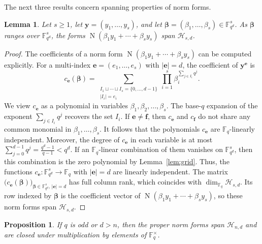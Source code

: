 \documentclass[12pt,reqno]{amsart}
\newtheorem{lem}[thm]{Lemma}
\newtheorem{prop}[thm]{Proposition}
\theoremstyle{definition}
\newcommand{\Nm}{\operatorname{N}}
\newcommand{\F}{\mathbb{F}}
\newcommand{\cH}{\mathcal H}
\begin{document}
The next three results concern spanning properties of norm forms.

\begin{lem}\label{lem:norm-coefficient-separation}
Let $s\geq1$, let $\mathbf y=(y_1,\ldots,y_s)$, and let
$\boldsymbol{\beta}=(\beta_1,\ldots,\beta_s)\in \F_{q^d}^s$. As $\boldsymbol{\beta}$ ranges over $\F_{q^d}^s$, the forms $\Nm(\beta_1y_1+\cdots+\beta_sy_s)$ span $\cH_{s,d}$.
\end{lem}

\begin{proof}
The coefficients of a norm form $\Nm(\beta_1y_1+\cdots+\beta_sy_s)$ can be computed explicitly. For a multi-index $\mathbf e=(e_1,\ldots,e_s)$ with
$|\mathbf e|=d$, the coefficient of
$\mathbf y^{\mathbf e}$ is
\begin{equation}\label{eq:coefficient-polynomial}
 c_{\mathbf e}(\boldsymbol{\beta})=\sum_{\substack{I_1\sqcup\cdots\sqcup I_s=\{0,\ldots,d-1\}\\
                   |I_i|=e_i}}
    \prod_{i=1}^s
    \beta_i^{\sum_{j\in I_i}q^j}.
\end{equation}
We view $c_{\mathbf{e}}$ as a polynomial in variables $\beta_1, \beta_2, \ldots, \beta_s$. The base-$q$ expansion of the exponent
$\sum_{j\in I_i}q^j$ recovers the set $I_i$. If $\mathbf e\neq\mathbf f$, then $c_{\mathbf e}$ and $c_{\mathbf f}$ do not share any common monomial in $\beta_1, \ldots, \beta_{s}$. It follows that the polynomials $c_{\mathbf{e}}$ are $\F_q$-linearly independent. Moreover, the degree of $c_{\mathbf{e}}$ in each variable is at most $\sum_{j=0}^{d-1}q^j=\frac{q^d-1}{q-1}<q^d$. If an $\F_q$-linear combination of them vanishes on $\F_{q^d}^s$, then this combination is the zero polynomial by  Lemma~\ref{lem:grid}. Thus, the functions $c_{\mathbf{e}}\colon\F_{q^d}^s\to\F_q$ with $|\mathbf{e}|=d$ are linearly independent. The matrix $\bigl(c_{\mathbf{e}}(\boldsymbol\beta)\bigr)_{\boldsymbol\beta\in \F_{q^d}^s,\,|\mathbf{e}|=d}$ has full column rank, which coincides with $\dim_{\F_q}\cH_{s,d}$. Its row indexed by $\boldsymbol\beta$ is the coefficient vector of $\Nm(\beta_1y_1+\cdots+\beta_sy_s)$, so these norm forms span $\cH_{s,d}$.
\end{proof}

\begin{prop}
\label{prop:proper-norm-generation}
If $q$ is odd or $d>n$, then the proper norm forms span $\cH_{n,d}$ and are closed under multiplication by elements of $\F_q^\times$.
\end{prop}
\end{document}
